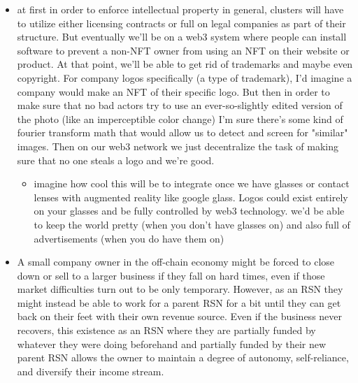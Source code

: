 \documentclass{article}[10pt]
\begin{document}
\begin{itemize}
    \item at first in order to enforce intellectual property in general, clusters will have to utilize either licensing contracts or full on legal companies as part of their structure. 
    But eventually we'll be on a web3 system where people can install software to prevent a non-NFT owner from using an NFT on their website or product. 
    At that point, we'll be able to get rid of trademarks and maybe even copyright. 
    For company logos specifically (a type of trademark), I'd imagine a company would make an NFT of their specific logo. 
    But then in order to make sure that no bad actors try to use an ever-so-slightly edited version of the photo (like an imperceptible color change) I'm sure there's some kind of fourier transform math that would allow us to detect and screen for "similar" images. 
    Then on our web3 network we just decentralize the task of making sure that no one steals a logo and we're good. 
    \begin{itemize}
        \item imagine how cool this will be to integrate once we have glasses or contact lenses with augmented reality like google glass.
        Logos could exist entirely on your glasses and be fully controlled by web3 technology.
        we'd be able to keep the world pretty (when you don't have glasses on) and also full of advertisements (when you do have them on)
    \end{itemize}

    \item A small company owner in the off-chain economy might be forced to close down or sell to a larger business if they fall on hard times, even if those market difficulties turn out to be only temporary.
    However, as an RSN they might instead be able to work for a parent RSN for a bit until they can get back on their feet with their own revenue source.
    Even if the business never recovers, this existence as an RSN where they are partially funded by whatever they were doing beforehand and partially funded by their new parent RSN allows the owner to maintain a degree of autonomy, self-reliance, and diversify their income stream.


\end{itemize}
\end{document}
